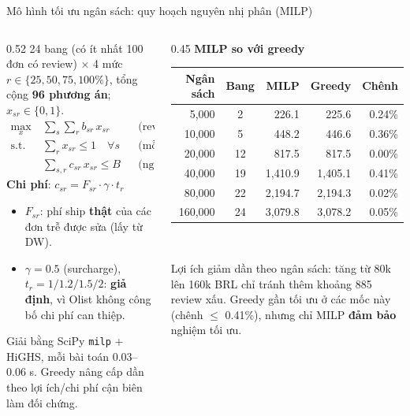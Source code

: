 \documentclass[aspectratio=169,10pt,xcolor=table]{beamer}
\begin{document}
\begin{frame}{Mô hình tối ưu ngân sách: quy hoạch nguyên nhị phân (MILP)}
  \begin{columns}[T]
    \begin{column}{0.52\textwidth}
      \footnotesize
      24 bang (có ít nhất 100 đơn có review) $\times$ 4 mức $r\in\{25,50,75,100\%\}$, tổng cộng \textbf{96 phương án}; $x_{sr}\in\{0,1\}$.
      \begin{align*}
        \max_x\ & \textstyle\sum_{s}\sum_{r} b_{sr}\,x_{sr} &&\text{(review xấu tránh được)}\\
        \text{s.t.}\ & \textstyle\sum_r x_{sr} \le 1 \quad \forall s &&\text{(mỗi bang 1 mức)}\\
        & \textstyle\sum_{s,r} c_{sr}\,x_{sr} \le B &&\text{(ngân sách)}
      \end{align*}
      \textbf{Chi phí}: $c_{sr} = F_{sr}\cdot\gamma\cdot t_r$
      \begin{itemize}
        \item $F_{sr}$: phí ship \textbf{thật} của các đơn trễ được sửa (lấy từ DW).
        \item $\gamma=0.5$ (surcharge), $t_r = 1/1.2/1.5/2$: \textbf{giả định}, vì Olist không công bố chi phí can thiệp.
      \end{itemize}
      {\scriptsize Giải bằng SciPy \texttt{milp} + HiGHS, mỗi bài toán 0.03--0.06 s. Greedy nâng cấp dần theo lợi ích/chi phí cận biên làm đối chứng.\par}
    \end{column}
    \begin{column}{0.45\textwidth}
      \centering
      \footnotesize
      \textbf{MILP so với greedy}\\[0.05cm]
      \begin{tabular}{@{}rcrrr@{}}
        \toprule
        Ngân sách & Bang & MILP & Greedy & Chênh\\
        \midrule
        5,000 & 2 & 226.1 & 225.6 & 0.24\%\\
        10,000 & 5 & 448.2 & 446.6 & 0.36\%\\
        20,000 & 12 & 817.5 & 817.5 & 0.00\%\\
        \rowcolor{accent!12}40,000 & 19 & 1,410.9 & 1,405.1 & 0.41\%\\
        80,000 & 22 & 2,194.7 & 2,194.3 & 0.02\%\\
        160,000 & 24 & 3,079.8 & 3,078.2 & 0.05\%\\
        \bottomrule
      \end{tabular}\\[0.15cm]
      \begin{keybox}
        Lợi ích giảm dần theo ngân sách: tăng từ 80k lên 160k BRL chỉ tránh thêm khoảng 885 review xấu. Greedy gần tối ưu ở các mốc này (chênh $\le$ 0.41\%), nhưng chỉ MILP \textbf{đảm bảo} nghiệm tối ưu.
      \end{keybox}
    \end{column}
  \end{columns}
\end{frame}
\end{document}
